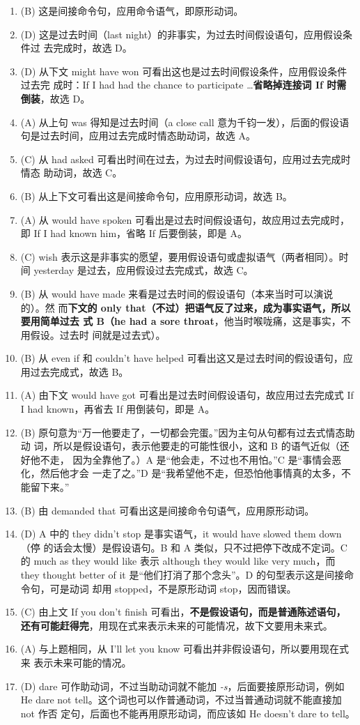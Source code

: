 \begin{enumerate}
\item (B) 这是间接命令句，应用命令语气，即原形动词。
\item (D) 这是过去时间（last night）的非事实，为过去时间假设语句，应用假设条件过
  去完成时，故选 D。
\item (D) 从下文 might have won 可看出这也是过去时间假设条件，应用假设条件过去完
  成时：If I had had the chance to participate \ldots \textbf{省略掉连接词 If 时需
    倒装}，故选 D。
\item (A) 从上句 was 得知是过去时间（a close call 意为千钧一发），后面的假设语
  句是过去时间，应用过去完成时情态助动词，故选 A。
\item (C) 从 had asked 可看出时间在过去，为过去时间假设语句，应用过去完成时情态
  助动词，故选 C。
\item (B) 从上下文可看出这是间接命令句，应用原形动词，故选 B。
\item (A) 从 would have spoken 可看出是过去时间假设语句，故应用过去完成时，
  即 If I had known him，省略 If 后要倒装，即是 A。
\item (C) wish 表示这是非事实的愿望，要用假设语句或虚拟语气（两者相同）。时
  间 yesterday 是过去，应用假设过去完成式，故选 C。
\item (B) 从 would have made 来看是过去时间的假设语句（本来当时可以演说的）。然
  而\textbf{下文的 only that（不过）把语气反了过来，成为事实语气，所以要用简单过去
    式 B（he had a sore throat}，他当时喉咙痛，这是事实，不用假设。过去时
  间就是过去式）。
\item (B) 从 even if 和 couldn't have helped 可看出这又是过去时间的假设语句，应
  用过去完成式，故选 B。
\item (A) 由下文 would have got 可看出是过去时间假设语句，故应用过去完成式 If I
  had known，再省去 If 用倒装句，即是 A。
\item (B) 原句意为“万一他要走了，一切都会完蛋。”因为主句从句都有过去式情态助动
  词，所以是假设语句，表示他要走的可能性很小，这和 B 的语气近似（还好他不走，
  因为全靠他了。）A 是“他会走，不过也不用怕。”C 是“事情会恶化，然后他才会
  一走了之。”D 是“我希望他不走，但恐怕他事情真的太多，不能留下来。”
\item (B) 由 demanded that 可看出这是间接命令句语气，应用原形动词。
\item (D) A 中的 they didn't stop 是事实语气，it would have slowed them down（停
  的话会太慢）是假设语句。B 和 A 类似，只不过把停下改成不定词。C 的 much as
  they would like 表示 although they would like very much，而 they thought
  better of it 是“他们打消了那个念头”。D 的句型表示这是间接命令句，可是动词
  却用 stopped，不是原形动词 stop，因而错误。
\item (C) 由上文 If you don't finish 可看出，\textbf{不是假设语句，而是普通陈述语句，
    还有可能赶得完}，用现在式来表示未来的可能情况，故下文要用未来式。
\item (A) 与上题相同，从 I'll let you know 可看出并非假设语句，所以要用现在式来
  表示未来可能的情况。
\item (D) dare 可作助动词，不过当助动词就不能加 \emph{-s}，后面要接原形动词，例如 He
  dare not tell。这个词也可以作普通动词，不过当普通动词就不能直接加 not 作否
  定句，后面也不能再用原形动词，而应该如 He doesn't dare to tell。


\end{enumerate}

